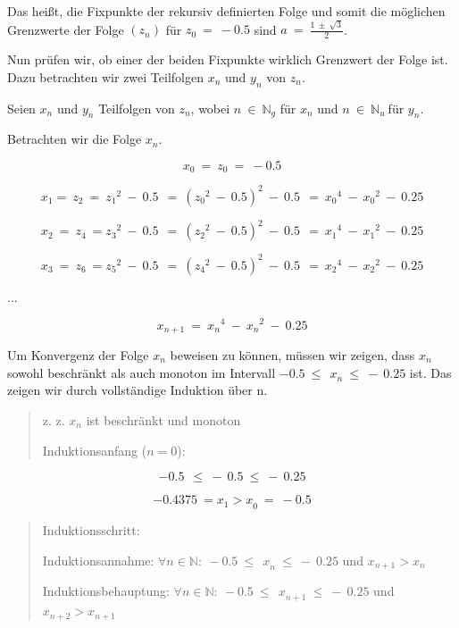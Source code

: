 \documentclass{book}
\begin{document}
\begin{longtable}[]
\begin{minipage}[b]{\linewidth}
Das heißt, die Fixpunkte der rekursiv definierten Folge und somit die
möglichen Grenzwerte der Folge \(\left( z_{n} \right)\) für
\(z_{0}\  = \  - 0.5\) sind \(a\  = \ \frac{1\  \pm \ \sqrt{3}}{2}\).

Nun prüfen wir, ob einer der beiden Fixpunkte wirklich Grenzwert der
Folge ist. Dazu betrachten wir zwei Teilfolgen \(x_{n}\) und \(y_{n}\)
von \(z_{n}\).

Seien \(x_{n}\) und \(y_{n}\) Teilfolgen von \(z_{n}\), wobei
\(n\  \in \ \mathbb{N}_{g}\) für \(x_{n}\) und
\(n\  \in \ \mathbb{N}_{u}\ \)für \(y_{n}\).

Betrachten wir die Folge \(x_{n}\).

\[x_{0}\  = \ z_{0}\  = \  - 0.5\]

\[x_{1}{= \ z}_{2}\  = \ {z_{1}}^{2}\  - \ 0.5\ \  = \ ({z_{0}}^{2}\  - \ 0.5)^{2}\  - \ 0.5\ \  = \ {x_{0}}^{4}\  - \ {x_{0}}^{2}\  - \ 0.25\]

\[x_{2}\  = \ z_{4}\  = {z_{3}}^{2}\  - \ 0.5\ \  = \ ({z_{2}}^{2}\  - \ 0.5)^{2}\  - \ 0.5\ \  = \ {x_{1}}^{4}\  - \ {x_{1}}^{2}\  - \ 0.25\]

\[x_{3}\  = \ z_{6}\  = {z_{5}}^{2}\  - \ 0.5\ \  = \ ({z_{4}}^{2}\  - \ 0.5)^{2}\  - \ 0.5\ \  = \ {x_{2}}^{4}\  - \ {x_{2}}^{2}\  - \ 0.25\]

...

\[x_{n + 1}\  = \ {x_{n}}^{4}\  - \ {x_{n}}^{2}\  - \ 0.25\]

Um Konvergenz der Folge \(x_{n}\) beweisen zu können, müssen wir zeigen,
dass \(x_{n}\) sowohl beschränkt als auch monoton im Intervall
\(- 0.5\ {\leq \ \ x}_{n}\  \leq \  - \ 0.25\) ist. Das zeigen wir durch
vollständige Induktion über n.

\begin{quote}
z. z. \(x_{n}\) ist beschränkt und monoton

Induktionsanfang (\(n = 0\)):
\end{quote}

\[- 0.5\ \  \leq \  - \ 0.5\  \leq \  - \ 0.25\]

\[{{- 0.4375\  = x}_{1} > x}_{0}\  = \  - 0.5\]

\begin{quote}
Induktionsschritt:

Induktionsannahme:
\(\forall n \in \mathbb{N:\ } - 0.5\ {\leq \ \ x}_{n}\  \leq \  - \ 0.25\)
und \(x_{n + 1} > x_{n}\)

Induktionsbehauptung:
\(\forall n \in \mathbb{N:\ } - 0.5\ {\leq \ \ x}_{n + 1}\  \leq \  - \ 0.25\)
und \(x_{n + 2} > x_{n + 1}\)
\end{quote}


\end{minipage}
\end{longtable}
\end{document}
